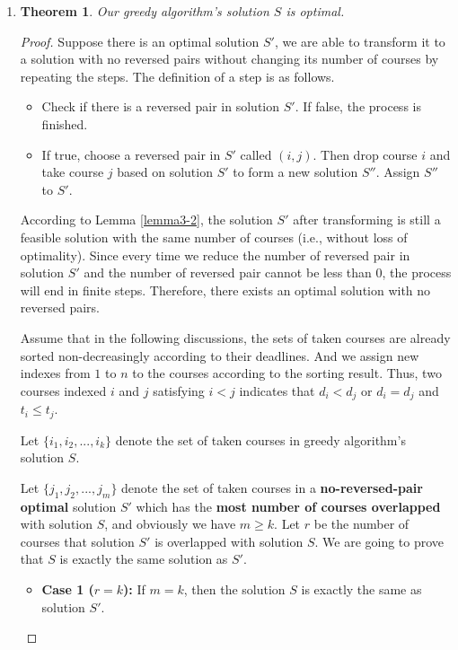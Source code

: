 \documentclass[12pt,a4paper]{article}
\makeatletter
\newtheorem{theorem}{Theorem}
\newtheorem*{solution}{Solution}
\theoremstyle{definition}
\renewenvironment{solution}[1][Solution] {\par\pushQED{\qed}\normalfont\topsep6\p@\@plus6\p@\relax\trivlist\item[\hskip\labelsep\bfseries#1\@addpunct{.}]\ignorespaces}{\popQED\endtrivlist\@endpefalse} \makeatother
\makeatother
\begin{document}
\begin{enumerate}
\begin{solution}
        \begin{theorem}
        Our greedy algorithm's solution $S$ is optimal.
        \end{theorem}
        \begin{proof}
        Suppose there is an optimal solution $S'$, we are able to transform it to a solution with no reversed pairs without changing its number of courses by repeating the steps. The definition of a step is as follows.
        \begin{itemize}
        \item Check if there is a reversed pair in solution $S'$. If false, the process is finished.
        \item If true, choose a reversed pair in $S'$ called $(i,j)$. Then drop course $i$ and take course $j$ based on solution $S'$ to form a new solution $S''$. Assign $S''$ to $S'$.
        \end{itemize}
        According to Lemma \ref{lemma3-2}, the solution $S'$ after transforming is still a feasible solution with the same number of courses (i.e., without loss of optimality). Since every time we reduce the number of reversed pair in solution $S'$ and the number of reversed pair cannot be less than 0, the process will end in finite steps. Therefore, {\color{blue}there exists an optimal solution with no reversed pairs}.

        Assume that in the following discussions, the sets of taken courses are already sorted non-decreasingly according to their deadlines. And we assign new indexes from $1$ to $n$ to the courses according to the sorting result. Thus, two courses indexed $i$ and $j$ satisfying $i < j$ indicates that $d_i < d_j$ or $d_i = d_j$ and $t_i \leq t_j$.

        Let $\{i_1, i_2, ..., i_k\}$ denote the set of taken courses in greedy algorithm's solution $S$.

        Let $\{j_1, j_2, ..., j_m\}$ denote the set of taken courses in a \textbf{no-reversed-pair optimal} solution $S'$ which has the \textbf{most number of courses overlapped} with solution $S$, and obviously we have $m \geq k$. Let $r$ be the number of courses that solution $S'$ is overlapped with solution $S$. We are going to prove that $S$ is
        exactly the same solution as $S'$.
        \begin{itemize}
        \item \textbf{Case 1 ($r = k$):} If $m = k$, then the solution $S$ is exactly the same as solution $S'$.


\end{itemize}
\end{proof}
\end{solution}
\end{enumerate}
\end{document}
